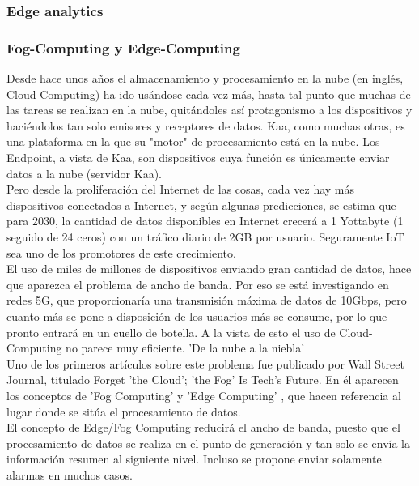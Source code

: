 \documentclass[12pt, twoside]{book}
\begin{document}
\subsubsection*{Edge analytics}
\subsubsection*{Fog-Computing y Edge-Computing}
Desde hace unos años el almacenamiento y procesamiento en la nube (en inglés, Cloud Computing) ha ido usándose cada vez más, hasta tal punto que muchas de las tareas se realizan en la nube, quitándoles así protagonismo a los dispositivos y haciéndolos tan solo emisores y receptores de datos. Kaa, como muchas otras, es una plataforma en la que su "motor" de procesamiento está en la nube. Los Endpoint, a vista de Kaa, son dispositivos cuya función es únicamente enviar datos a la nube (servidor Kaa). \\
Pero desde la proliferación del Internet de las cosas, cada vez hay más dispositivos conectados a Internet, y según algunas predicciones, se estima que para 2030, la cantidad de datos disponibles en Internet crecerá a 1 Yottabyte (1 seguido de 24 ceros) con un tráfico diario de 2GB por usuario. Seguramente IoT sea uno de los promotores de este crecimiento. \\
El uso de miles de millones de dispositivos enviando gran cantidad de datos, hace que aparezca el problema de ancho de banda. Por eso se está investigando en redes 5G, que proporcionaría una transmisión máxima de datos de 10Gbps, pero cuanto más se pone a disposición de los usuarios más se consume, por lo que pronto entrará en un cuello de botella. A la vista de esto el uso de Cloud-Computing no parece muy eficiente. 'De la nube a la niebla'\\
Uno de los primeros artículos sobre este problema fue publicado por Wall Street Journal, titulado Forget 'the Cloud'; 'the Fog' Is Tech's Future. En él aparecen los conceptos de 'Fog Computing' y 'Edge Computing' \cite{wsj}, que hacen referencia al lugar donde se sitúa el procesamiento de datos.\\
El concepto de Edge/Fog Computing reducirá el ancho de banda, puesto que el procesamiento de datos se realiza en el punto de generación y tan solo se envía la información resumen al siguiente nivel. Incluso se propone enviar solamente alarmas en muchos casos. 
\end{document}

